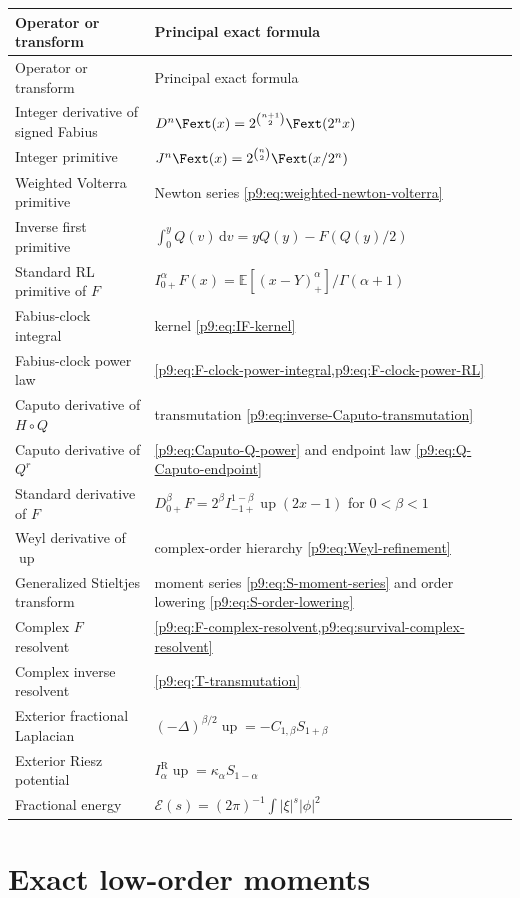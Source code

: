 \documentclass[11pt,oneside]{article}
\theoremstyle{definition}
\theoremstyle{remark}
\newcommand{\Up}{\operatorname{up}}
\newcommand{\E}{\mathbb E}
\newcommand{\dd}{\,\mathrm d}
\newcommand{\1}{\mathbf 1}
\begin{document}
\begin{longtable}{@{}p{}p{}@{}}
\toprule
Operator or transform & Principal exact formula\\
\midrule
\endfirsthead
\toprule
Operator or transform & Principal exact formula\\
\midrule
\endhead
Integer derivative of signed Fabius
& $D^n\Fext(x)=2^{\binom{n+1}{2}}\Fext(2^nx)$\\
Integer primitive
& $J^n\Fext(x)=2^{\binom n2}\Fext(x/2^n)$\\
Weighted Volterra primitive
& Newton series \cref{p9:eq:weighted-newton-volterra}\\
Inverse first primitive
& $\displaystyle\int_0^yQ(v)\dd v=yQ(y)-F(Q(y)/2)$\\
Standard RL primitive of $F$
& $I_{0+}^\alpha F(x)=\E[(x-Y)_+^\alpha]/\Gamma(\alpha+1)$\\
Fabius-clock integral
& kernel \cref{p9:eq:IF-kernel}\\
Fabius-clock power law
& \cref{p9:eq:F-clock-power-integral,p9:eq:F-clock-power-RL}\\
Caputo derivative of $H\circ Q$
& transmutation \cref{p9:eq:inverse-Caputo-transmutation}\\
Caputo derivative of $Q^r$
& \cref{p9:eq:Caputo-Q-power} and endpoint law
  \cref{p9:eq:Q-Caputo-endpoint}\\
Standard derivative of $F$
& $D_{0+}^\beta F=2^\beta I_{-1+}^{1-\beta}\Up(2x-1)$ for $0<\beta<1$\\
Weyl derivative of $\Up$
& complex-order hierarchy \cref{p9:eq:Weyl-refinement}\\
Generalized Stieltjes transform
& moment series \cref{p9:eq:S-moment-series} and order lowering
  \cref{p9:eq:S-order-lowering}\\
Complex $F$ resolvent
& \cref{p9:eq:F-complex-resolvent,p9:eq:survival-complex-resolvent}\\
Complex inverse resolvent
& \cref{p9:eq:T-transmutation}\\
Exterior fractional Laplacian
& $(-\Delta)^{\beta/2}\Up=-C_{1,\beta}S_{1+\beta}$\\
Exterior Riesz potential
& $I_\alpha^{\mathrm R}\Up=\kappa_\alpha S_{1-\alpha}$\\
Fractional energy
& $\mathcal E(s)=(2\pi)^{-1}\int|\xi|^s|\phi|^2$\\
\bottomrule
\end{longtable}

\section{Exact low-order moments}
\end{document}
